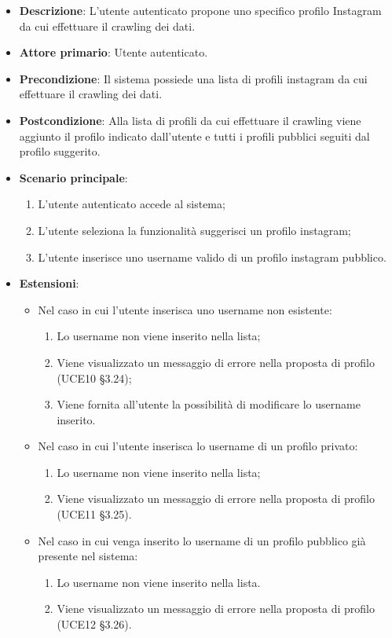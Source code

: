 \begin{itemize}
	\item \textbf{Descrizione}: L'utente autenticato propone uno specifico profilo Instagram da cui effettuare il crawling dei dati.
    \item \textbf{Attore primario}: Utente autenticato.
    \item \textbf{Precondizione}: Il sistema possiede una lista di profili instagram da cui effettuare il crawling dei dati.
    \item \textbf{Postcondizione}: Alla lista di profili da cui effettuare il crawling viene aggiunto il profilo indicato dall’utente e tutti i profili pubblici seguiti dal profilo suggerito.
    \item \textbf{Scenario principale}: 
    \begin{enumerate}
        \item L'utente autenticato accede al sistema;
        \item L’utente seleziona la funzionalità suggerisci un profilo instagram;
        \item L’utente inserisce uno username valido di un profilo instagram pubblico.
    \end{enumerate}
    \item \textbf{Estensioni}:
    \begin{itemize}
        \item Nel caso in cui l’utente inserisca uno username non esistente:
        \begin{enumerate}
            \item Lo username non viene inserito nella lista;
            \item Viene visualizzato un messaggio di errore nella proposta di profilo (UCE10 §3.24);
            \item Viene fornita all’utente la possibilità di modificare lo username inserito.
        \end{enumerate}
        \item Nel caso in cui l’utente inserisca lo username di un profilo privato:
        \begin{enumerate}
            \item Lo username non viene inserito nella lista;
            \item Viene visualizzato un messaggio di errore nella proposta di profilo (UCE11 §3.25).
        \end{enumerate}
        \item Nel caso in cui venga inserito lo username di un profilo pubblico già presente nel sistema:
        \begin{enumerate}
            \item Lo username non viene inserito nella lista.
            \item Viene visualizzato un messaggio di errore nella proposta di profilo (UCE12 §3.26).
        \end{enumerate} 
    \end{itemize}
\end{itemize}

